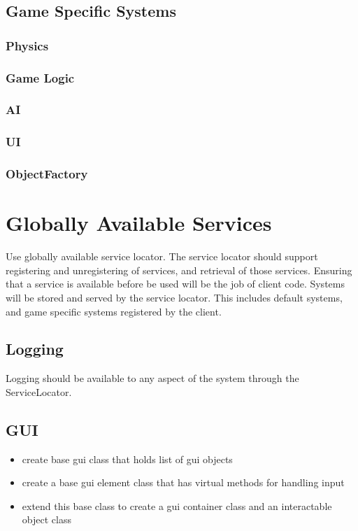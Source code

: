 \documentclass[12pt]{article}
\begin{document}
\subsection{Game Specific Systems}

\subsubsection{	Physics}
\subsubsection{	Game Logic}
\subsubsection{	AI}
\subsubsection{	UI}
\subsubsection{	ObjectFactory}

\section{ Globally Available Services}
Use globally available service locator.  The service locator should support registering and unregistering of services, and retrieval of those services.  Ensuring that a service is available before be used will be the job of client code.  Systems will be stored and served by the service locator.  This includes default systems, and game specific systems registered by the client.

\subsection{ Logging }
Logging should be available to any aspect of the system through the ServiceLocator.

\subsection{ GUI }
\begin{itemize}
	\item create base gui class that holds list of gui objects
	\item create a base gui element class that has virtual methods for handling input
	\item extend this base class to create a gui container class and an interactable object class
\end{itemize}
\end{document}
